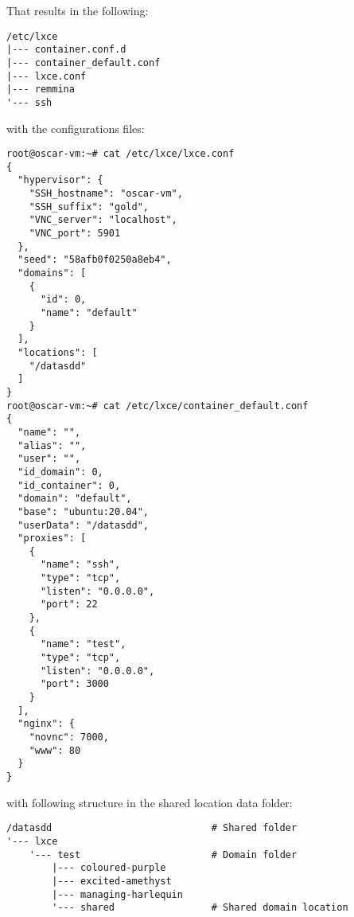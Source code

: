 That results in the following:
\begin{verbatim}
/etc/lxce 
|--- container.conf.d 			
|--- container_default.conf 		
|--- lxce.conf 			
|--- remmina 		
'--- ssh 	
\end{verbatim}
with the configurations files:
\begin{verbatim}
root@oscar-vm:~# cat /etc/lxce/lxce.conf
{
  "hypervisor": {
    "SSH_hostname": "oscar-vm",
    "SSH_suffix": "gold",
    "VNC_server": "localhost",
    "VNC_port": 5901
  },
  "seed": "58afb0f0250a8eb4",
  "domains": [
    {
      "id": 0,
      "name": "default"
    }
  ],
  "locations": [
    "/datasdd"
  ]
}
root@oscar-vm:~# cat /etc/lxce/container_default.conf
{
  "name": "",
  "alias": "",
  "user": "",
  "id_domain": 0,
  "id_container": 0,
  "domain": "default",
  "base": "ubuntu:20.04",
  "userData": "/datasdd",
  "proxies": [
    {
      "name": "ssh",
      "type": "tcp",
      "listen": "0.0.0.0",
      "port": 22
    },
    {
      "name": "test",
      "type": "tcp",
      "listen": "0.0.0.0",
      "port": 3000
    }
  ],
  "nginx": {
    "novnc": 7000,
    "www": 80
  }
}
\end{verbatim}

with following structure in the shared location data folder:
\begin{verbatim}
/datasdd                            # Shared folder
'--- lxce
    '--- test                       # Domain folder
        |--- coloured-purple
        |--- excited-amethyst
        |--- managing-harlequin
        '--- shared                 # Shared domain location
\end{verbatim}
